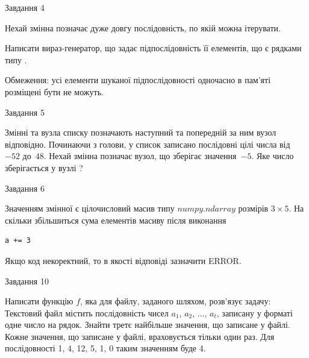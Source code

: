 \documentclass[12pt, ukrainian]{article}
\begin{document}
{               
{\begin{center}Завдання {4}\end{center}}
\vspace{-6mm}
Нехай змінна  позначає дуже довгу послідовність, по якій можна ітерувати.

Написати вираз-генератор, що задає підпослідовність її елементів, що є рядками типу .

Обмеження: усі елементи шуканої підпослідовності одночасно в пам'яті розміщені бути не можуть.\par

\vspace{10mm}
               
{\begin{center}Завдання {5}\end{center}}
\vspace{-6mm}
Змінні  та  вузла списку позначають наступний та попередній за ним вузол відповідно. Починаючи з голови, у список записано послідовні цілі числа від~$-52$ до~$48$. Нехай змінна  позначає вузол, що зберігає значення~$-5$.
Яке число зберігається у вузлі  ?\par

               
{\begin{center}Завдання {6}\end{center}}
\vspace{-6mm}
Значенням змінної  є цілочисловий масив типу $numpy.ndarray$ розмірів $3{\times}5$. На скільки збільшиться сума елементів масиву  після виконання
\begin{verbatim}
a += 3
\end{verbatim}


Якщо код некоректний, то в якості відповіді зазначити ERROR.\par

               
{\begin{center}Завдання {10}\end{center}}
\vspace{-6mm}

Написати функцію $f$, яка для файлу, заданого шляхом, розв’язує задачу:\\ Текстовий файл містить послідовність чисел $a_1$, $a_2$, $\ldots$, $a_t$, записану у форматі одне число на рядок. Знайти третє найбільше значення, що записане у файлі. Кожне значення, що записане у файлі, враховується тільки один раз. Для послідовності 1, 4, 12, 5, 1, 0 таким значенням буде 4.

}
\end{document}
